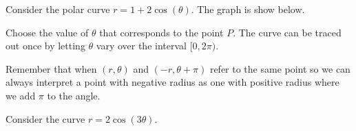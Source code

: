 \documentclass{ximera}
\author{Jason Miller}
\begin{document}
\begin{exercise}



Consider the polar curve $r=1+2\cos(\theta)$. The graph is show below. 




\begin{image}  
\end{image} 

Choose the value of $\theta$ that corresponds to the point $P$. The curve can be traced out once by letting $\theta$ vary over the interval $[0, 2\pi)$.

\begin{multipleChoice}
\choice{$\pi$}
\end{multipleChoice}


\begin{hint}
Remember that when $(r, \theta)$ and $(-r, \theta + \pi)$ refer to the same point so we can always interpret a point with negative radius as one with 
positive radius where we add $\pi$ to the angle. 
\end{hint}



\begin{exercise}

Consider the curve $r=2\cos(3\theta)$.



\end{exercise}
\end{exercise}
\end{document}
